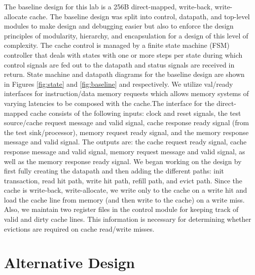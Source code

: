 \documentclass[10pt]{article}
\begin{document}
The baseline design for this lab is a 256B direct-mapped, write-back, write-allocate cache. The baseline design was split into control, datapath, and top-level modules to make design and debugging easier but also to enforce the design principles of modularity, hierarchy, and encapsulation for a design of this level of complexity. The cache control is managed by a finite state machine (FSM) controller that deals with states with one or more steps per state during which control signals are fed out to the datapath and status signals are received in return. State machine and datapath diagrams for the baseline design are shown in Figures \ref{fig:state} and \ref{fig:baseline} and respectively. We utilize val/ready interfaces for instruction/data memory requests which allows memory systems of varying latencies to be composed with the cache.The interface for the direct-mapped cache consists of the following inputs: clock and reset signals, the test source/cache request message and valid signal, cache response ready signal (from the test sink/processor), memory request ready signal, and the memory response message and valid signal. The outputs are: the cache request ready signal, cache response message and valid signal, memory request message and valid signal, as well as the memory response ready signal. We began working on the design by first fully creating the datapath and then adding the different paths: init transaction, read hit path, write hit path, refill path, and evict path. Since the cache is write-back, write-allocate, we write only to the cache on a write hit and load the cache line from memory (and then write to the cache) on a write miss. Also, we maintain two register files in the control module for keeping track of valid and dirty cache lines. This information is necessary for determining whether evictions are required on cache read/write misses. \\


\section{Alternative Design}
\end{document}
